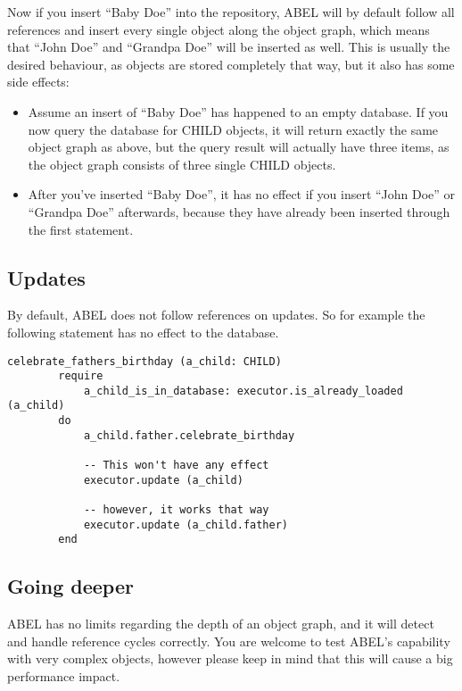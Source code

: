 Now if you insert ``Baby Doe'' into the repository, ABEL will by default follow all references and insert every single object along the object graph, which means that ``John Doe'' and ``Grandpa Doe'' will be inserted as well.
This is usually the desired behaviour, as objects are stored completely that way, but it also has some side effects:

\begin{itemize}
\item Assume an insert of ``Baby Doe'' has happened to an empty database. 
If you now query the database for CHILD objects, it will return exactly the same object graph as above, but the query result will actually have three items, as the object graph consists of three single CHILD objects.
	
\item After you've inserted ``Baby Doe'', it has no effect if you insert ``John Doe'' or ``Grandpa Doe'' afterwards, because they have already been inserted through the first statement.
\end{itemize}

\subsection{Updates}

By default, ABEL does not follow references on updates. So for example the following statement has no effect to the database.

\begin{lstlisting}[language=OOSC2Eiffel, captionpos=b, caption={}, label={lst:reference_update}]
	celebrate_fathers_birthday (a_child: CHILD)
		require
			a_child_is_in_database: executor.is_already_loaded (a_child)
		do
			a_child.father.celebrate_birthday

			-- This won't have any effect
			executor.update (a_child)

			-- however, it works that way
			executor.update (a_child.father)
		end
\end{lstlisting}

\subsection{Going deeper}

ABEL has no limits regarding the depth of an object graph, and it will detect and handle reference cycles correctly. 
You are welcome to test ABEL's capability with very complex objects, however please keep in mind that this will cause a big performance impact.

